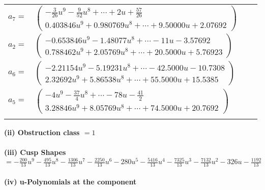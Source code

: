 \documentclass[1p]{elsarticle_modified}
\theoremstyle{definition}
\begin{document}
\begin{tabular}{m{7pt} m{180pt} m{7pt} m{180pt} }
\flushright $a_{7}=$&$\begin{pmatrix}-\frac{3}{26} u^9-\frac{9}{52} u^8+\cdots+2 u+\frac{57}{26}\\0.403846 u^{9}+0.980769 u^{8}+\cdots+9.50000 u+2.07692\end{pmatrix}$ \\
\flushright $a_{2}=$&$\begin{pmatrix}-0.653846 u^{9}-1.48077 u^{8}+\cdots-11 u-3.57692\\0.788462 u^{9}+2.05769 u^{8}+\cdots+20.5000 u+5.76923\end{pmatrix}$ \\
\flushright $a_{6}=$&$\begin{pmatrix}-2.21154 u^{9}-5.19231 u^{8}+\cdots-42.5000 u-10.7308\\2.32692 u^{9}+5.86538 u^{8}+\cdots+55.5000 u+15.5385\end{pmatrix}$ \\
\flushright $a_{5}=$&$\begin{pmatrix}-4 u^9-\frac{37}{4} u^8+\cdots-78 u-\frac{41}{2}\\3.28846 u^{9}+8.05769 u^{8}+\cdots+74.5000 u+20.7692\end{pmatrix}$\\&\end{tabular}
\flushleft \textbf{(ii) Obstruction class $= 1$}\\~\\
\flushleft \textbf{(iii) Cusp Shapes $= -\frac{200}{13} u^9-\frac{495}{13} u^8-\frac{1306}{13} u^7-\frac{2250}{13} u^6-280 u^5-\frac{5416}{13} u^4-\frac{7325}{13} u^3-\frac{7132}{13} u^2-326 u-\frac{1192}{13}$}\\~\\
\newpage\renewcommand{\arraystretch}{1}
\flushleft \textbf{(iv) u-Polynomials at the component}\newline \\
\end{document}
